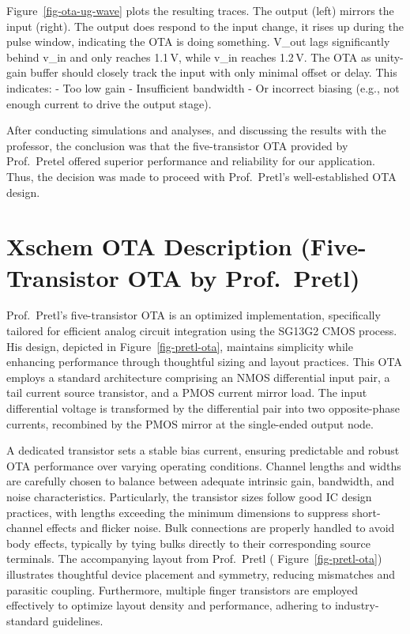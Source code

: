 \documentclass[
  letterpaper,
]{scrbook}
\begin{document}
Figure~\ref{fig-ota-ug-wave} plots the resulting traces. The output
(left) mirrors the input (right). The output does respond to the input
change, it rises up during the pulse window, indicating the OTA is doing
something. V\_out lags significantly behind v\_in and only reaches
1.1\,V, while v\_in reaches 1.2\,V. The OTA as unity-gain buffer should
closely track the input with only minimal offset or delay. This
indicates: - Too low gain - Insufficient bandwidth - Or incorrect
biasing (e.g., not enough current to drive the output stage).

After conducting simulations and analyses, and discussing the results
with the professor, the conclusion was that the five-transistor OTA
provided by Prof.~Pretel offered superior performance and reliability
for our application. Thus, the decision was made to proceed with
Prof.~Pretl's well-established OTA design.

\section{Xschem OTA Description (Five-Transistor OTA by
Prof.~Pretl)}\label{xschem-ota-description-five-transistor-ota-by-prof.-pretl}

Prof.~Pretl's five-transistor OTA is an optimized implementation,
specifically tailored for efficient analog circuit integration using the
SG13G2 CMOS process. His design, depicted in Figure~\ref{fig-pretl-ota},
maintains simplicity while enhancing performance through thoughtful
sizing and layout practices. This OTA employs a standard architecture
comprising an NMOS differential input pair, a tail current source
transistor, and a PMOS current mirror load. The input differential
voltage is transformed by the differential pair into two opposite-phase
currents, recombined by the PMOS mirror at the single-ended output node.

A dedicated transistor sets a stable bias current, ensuring predictable
and robust OTA performance over varying operating conditions. Channel
lengths and widths are carefully chosen to balance between adequate
intrinsic gain, bandwidth, and noise characteristics. Particularly, the
transistor sizes follow good IC design practices, with lengths exceeding
the minimum dimensions to suppress short-channel effects and flicker
noise. Bulk connections are properly handled to avoid body effects,
typically by tying bulks directly to their corresponding source
terminals. The accompanying layout from Prof.~Pretl (
Figure~\ref{fig-pretl-ota}) illustrates thoughtful device placement and
symmetry, reducing mismatches and parasitic coupling. Furthermore,
multiple finger transistors are employed effectively to optimize layout
density and performance, adhering to industry-standard guidelines.
\end{document}
